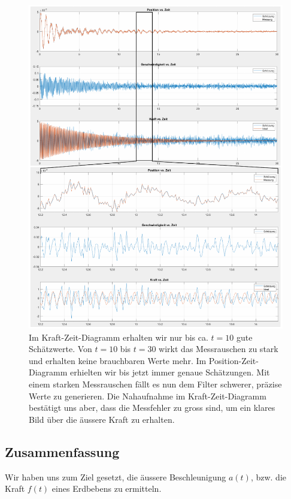 \begin{figure}
	\begin{center}
		\includegraphics[width=\linewidth,keepaspectratio]{papers/erdbeben/images/Messrauschen_geaendert.PDF}
		\caption{Im Kraft-Zeit-Diagramm erhalten wir nur bis ca. $t = 10$ gute Schätzwerte. Von $t = 10$ bis $t = 30$ wirkt das Messrauschen zu stark und erhalten keine brauchbaren Werte mehr. Im Position-Zeit-Diagramm erhielten wir bis jetzt immer genaue Schätzungen. Mit einem starken Messrauschen fällt es nun dem Filter schwerer, präzise Werte zu generieren. Die Nahaufnahme im Kraft-Zeit-Diagramm bestätigt uns aber, dass die Messfehler zu gross sind, um ein klares Bild über die äussere Kraft zu erhalten.}
	 \label{erdbeben:fig:messrauschen-geaendert}
	\end{center}
\end{figure}

\subsection{Zusammenfassung}
Wir haben uns zum Ziel gesetzt, die äussere Beschleunigung $a(t)$, bzw. die Kraft $f(t)$ eines Erdbebens zu ermitteln.

